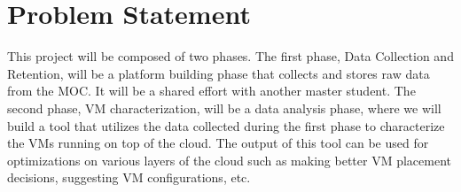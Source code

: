 \section{Problem Statement}
\label{sec:ProblemStatement}

%

This project will be composed of two phases. The first phase, Data Collection and Retention, will be a platform building phase that collects and stores raw data from the MOC. It will be a shared effort with another master student. The second phase, VM characterization, will be a data analysis phase, where we will build a tool that utilizes the data collected during the first phase to characterize the VMs running on top of the cloud. The output of this tool can be used for optimizations on various layers of the cloud such as making better VM placement decisions, suggesting VM configurations, etc.





